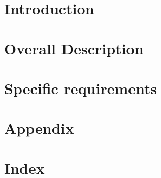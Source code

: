 \documentclass[11pt,a4paper,titlepage]{article}
\begin{document}




\section{Introduction}
\label{intro}



\section{Overall Description}
\label{description}



\section{Specific requirements}
\label{requirements}



\section{Appendix}
\label{appendix}



\section{Index}
\label{index}

\end{document}
